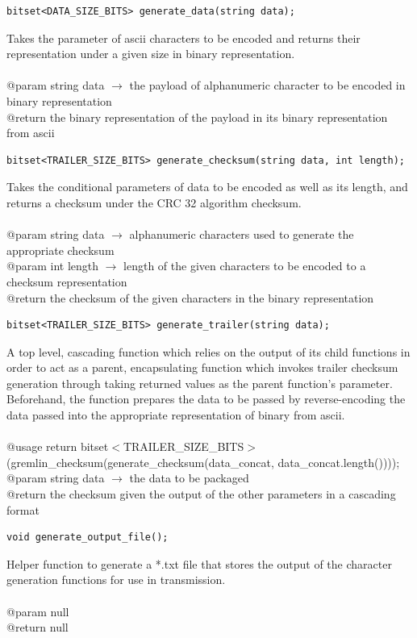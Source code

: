 \documentclass[12pt]{article}
\begin{document}
\begin{lstlisting}
bitset<DATA_SIZE_BITS> generate_data(string data);
\end{lstlisting}
Takes the parameter of ascii characters to be encoded and returns their representation under a given size in binary representation.\\\\
@param string data $\rightarrow$ the payload of alphanumeric character to be encoded in binary representation\\
@return the binary representation of the payload in its binary representation from ascii

\begin{lstlisting}
bitset<TRAILER_SIZE_BITS> generate_checksum(string data, int length);
\end{lstlisting}
Takes the conditional parameters of data to be encoded as well as its length, and returns a checksum under the CRC 32 algorithm checksum.\\\\
@param string data $\rightarrow$ alphanumeric characters used to generate the appropriate checksum\\
@param int length $\rightarrow$ length of the given characters to be encoded to a checksum representation\\
@return the checksum of the given characters in the binary representation

\begin{lstlisting}
bitset<TRAILER_SIZE_BITS> generate_trailer(string data);
\end{lstlisting}
A top level, cascading function which relies on the output of its child functions in order to act as a parent, encapsulating function which invokes trailer checksum generation through taking returned values as the parent function's parameter. Beforehand, the function prepares the data to be passed by reverse-encoding the data passed into the appropriate representation of binary from ascii.\\\\
@usage return bitset$<$TRAILER\_SIZE\_BITS$>$(gremlin\_checksum(generate\_checksum(data\_concat, data\_concat.length())));\\
@param string data $\rightarrow$ the data to be packaged\\
@return the checksum given the output of the other parameters in a cascading format

\begin{lstlisting}
void generate_output_file();
\end{lstlisting}
Helper function to generate a *.txt file that stores the output of the character generation functions for use in transmission.\\\\
@param null\\
@return null
\end{document}
